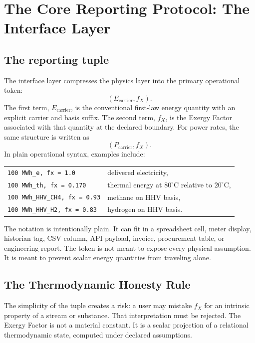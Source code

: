 \documentclass[11pt]{article}
\newcommand{\fx}{f_X}
\newcommand{\carrier}{\mathrm{carrier}}
\newcommand{\degC}{^{\circ}\mathrm{C}}
\begin{document}
\section{The Core Reporting Protocol: The Interface Layer}

\subsection{The reporting tuple}

The interface layer compresses the physics layer into the primary operational token:
\begin{equation}
(E_{\carrier},\fx).
\end{equation}
The first term, $E_{\carrier}$, is the conventional first-law energy quantity with an explicit carrier and basis suffix. The second term, $\fx$, is the Exergy Factor associated with that quantity at the declared boundary. For power rates, the same structure is written as
\begin{equation}
(P_{\carrier},\fx).
\end{equation}
In plain operational syntax, examples include:
\begin{center}
\begin{tabular}{@{}ll@{}}
\texttt{100 MWh\_e, fx = 1.0} & delivered electricity, \\
\texttt{100 MWh\_th, fx = 0.170} & thermal energy at $80\degC$ relative to $20\degC$, \\
\texttt{100 MWh\_HHV\_CH4, fx = 0.93} & methane on HHV basis, \\
\texttt{100 MWh\_HHV\_H2, fx = 0.83} & hydrogen on HHV basis. \\
\end{tabular}
\end{center}
The notation is intentionally plain. It can fit in a spreadsheet cell, meter display, historian tag, CSV column, API payload, invoice, procurement table, or engineering report. The token is not meant to expose every physical assumption. It is meant to prevent scalar energy quantities from traveling alone.

\subsection{The Thermodynamic Honesty Rule}

The simplicity of the tuple creates a risk: a user may mistake $\fx$ for an intrinsic property of a stream or substance. That interpretation must be rejected. The Exergy Factor is not a material constant. It is a scalar projection of a relational thermodynamic state, computed under declared assumptions.
\end{document}
